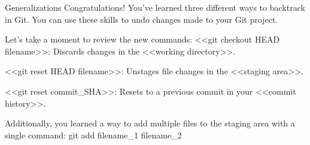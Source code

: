 Generalizations
    Congratulations! You’ve learned three different ways to backtrack in Git. You can use these skills to undo changes made to your Git project.

    Let’s take a moment to review the new commands:
        <<git checkout HEAD filename>>: Discards changes in the <<working directory>>.
        
        <<git reset HEAD filename>>: Unstages file changes in the <<staging area>>.

        <<git reset commit_SHA>>: Resets to a previous commit in your <<commit history>>.

    Additionally, you learned a way to add multiple files to the staging area with a single command:
        git add filename_1 filename_2